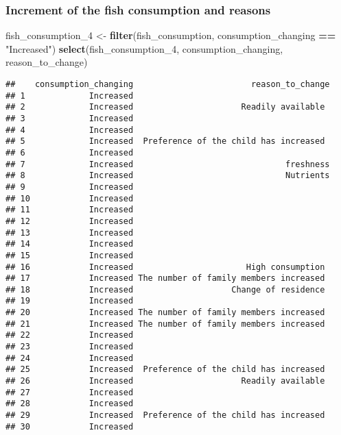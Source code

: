 \documentclass[
]{article}
\newenvironment{Shaded}{\begin{snugshade}}{\end{snugshade}}
\newcommand{\FunctionTok}[1]{\textcolor[rgb]{0.13,0.29,0.53}{\textbf{#1}}}
\newcommand{\NormalTok}[1]{#1}
\newcommand{\OtherTok}[1]{\textcolor[rgb]{0.56,0.35,0.01}{#1}}
\newcommand{\SpecialCharTok}[1]{\textcolor[rgb]{0.81,0.36,0.00}{\textbf{#1}}}
\newcommand{\StringTok}[1]{\textcolor[rgb]{0.31,0.60,0.02}{#1}}
\begin{document}
\hypertarget{increment-of-the-fish-consumption-and-reasons}{%
\subsubsection{Increment of the fish consumption and
reasons}\label{increment-of-the-fish-consumption-and-reasons}}

\begin{Shaded}
\begin{Highlighting}[]
\NormalTok{fish\_consumption\_4 }\OtherTok{\textless{}{-}} \FunctionTok{filter}\NormalTok{(fish\_consumption, consumption\_changing }\SpecialCharTok{==} \StringTok{"Increased"}\NormalTok{)}
                         \FunctionTok{select}\NormalTok{(fish\_consumption\_4, consumption\_changing, reason\_to\_change)}
\end{Highlighting}
\end{Shaded}

\begin{verbatim}
##    consumption_changing                        reason_to_change
## 1             Increased                                        
## 2             Increased                      Readily available 
## 3             Increased                                        
## 4             Increased                                        
## 5             Increased  Preference of the child has increased 
## 6             Increased                                        
## 7             Increased                               freshness
## 8             Increased                               Nutrients
## 9             Increased                                        
## 10            Increased                                        
## 11            Increased                                        
## 12            Increased                                        
## 13            Increased                                        
## 14            Increased                                        
## 15            Increased                                        
## 16            Increased                       High consumption 
## 17            Increased The number of family members increased 
## 18            Increased                    Change of residence 
## 19            Increased                                        
## 20            Increased The number of family members increased 
## 21            Increased The number of family members increased 
## 22            Increased                                        
## 23            Increased                                        
## 24            Increased                                        
## 25            Increased  Preference of the child has increased 
## 26            Increased                      Readily available 
## 27            Increased                                        
## 28            Increased                                        
## 29            Increased  Preference of the child has increased 
## 30            Increased
\end{verbatim}
\end{document}

